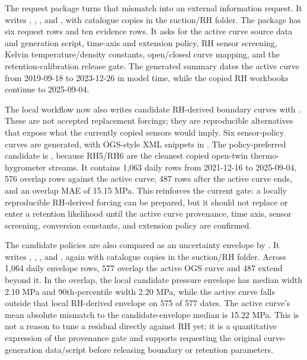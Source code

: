 The request package  turns that
mismatch into an external information request.  It writes
,
,
, and
, with catalogue copies in the suction/RH
 folder.  The package has six request rows and ten evidence rows.
It asks for the active curve source data and generation script, time-axis and
extension policy, RH sensor screening, Kelvin temperature/density constants,
open/closed curve mapping, and the retention-calibration release gate.  The generated
summary dates the active curve from 2019-09-18 to 2023-12-26 in model time, while the
copied RH workbooks continue to 2025-09-04.

The local workflow now also writes candidate RH-derived boundary curves with
.  These are not accepted replacement
forcings; they are reproducible alternatives that expose what the currently copied
sensors would imply.  Six sensor-policy curves are generated, with OGS-style XML
snippets in .  The policy-preferred candidate is
, because RH5/RH6 are the cleanest copied open-twin
thermo-hygrometer streams.  It contains 1,063 daily rows from 2021-12-16 to
2025-09-04, 576 overlap rows against the active curve, 487 rows after the active
curve ends, and an overlap MAE of 15.15 MPa.  This reinforces the current gate: a
locally reproducible RH-derived forcing can be prepared, but it should not replace
 or enter a retention likelihood until the active
curve provenance, time axis, sensor screening, conversion constants, and extension
policy are confirmed.

The candidate policies are also compared as an uncertainty envelope by
.  It writes
,
,
, and
, again with catalogue copies in the suction/RH
 folder.  Across 1,064 daily envelope rows, 577 overlap the
active OGS curve and 487 extend beyond it.  In the overlap, the local candidate
pressure envelope has median width 2.10 MPa and 90th-percentile width 2.20 MPa, while
the active curve falls outside that local RH-derived envelope on 575 of 577 dates.
The active curve's mean absolute mismatch to the candidate-envelope median is
15.22 MPa.  This is not a reason to tune a residual directly against RH yet; it is a
quantitative expression of the provenance gate and supports requesting the original
curve-generation data/script before releasing boundary or retention parameters.


